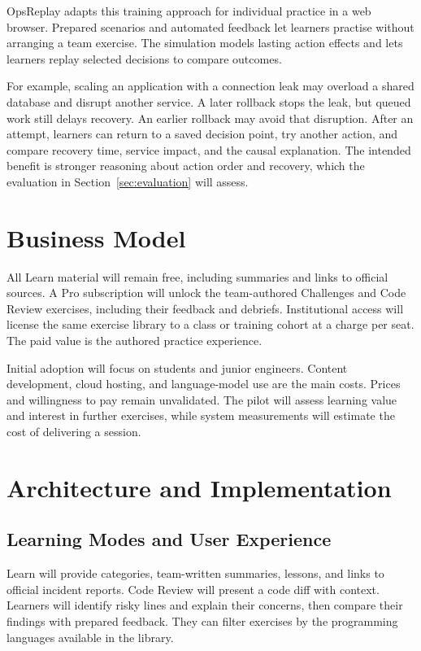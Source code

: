 \documentclass[11pt,a4paper]{article}
\begin{document}
OpsReplay adapts this training approach for individual practice in a web
browser. Prepared scenarios and automated feedback let learners practise
without arranging a team exercise. The simulation models lasting action
effects and lets learners replay selected decisions to compare outcomes.

For example, scaling an application with a connection leak may overload a
shared database and disrupt another service. A later rollback stops the leak,
but queued work still delays recovery. An earlier rollback may avoid that
disruption. After an attempt, learners can return to a saved decision point,
try another action, and compare recovery time, service impact, and the causal
explanation. The intended benefit is stronger reasoning about action order
and recovery, which the evaluation in Section~\ref{sec:evaluation} will assess.

\section{Business Model}
All Learn material will remain free, including summaries and links to
official sources. A Pro subscription will unlock the team-authored Challenges
and Code Review exercises, including their feedback and debriefs. Institutional
access will license the same exercise library to a class or training cohort
at a charge per seat. The paid value is the authored practice experience.

Initial adoption will focus on students and junior engineers. Content
development, cloud hosting, and language-model use are the main costs.
Prices and willingness to pay remain unvalidated. The pilot will assess
learning value and interest in further exercises, while system measurements
will estimate the cost of delivering a session.

\newpage
\section{Architecture and Implementation}
\subsection{Learning Modes and User Experience}
Learn will provide categories, team-written summaries, lessons, and links to
official incident reports. Code Review will present a code diff with context.
Learners will identify risky lines and explain their concerns, then compare
their findings with prepared feedback. They can filter exercises by the
programming languages available in the library.
\end{document}
